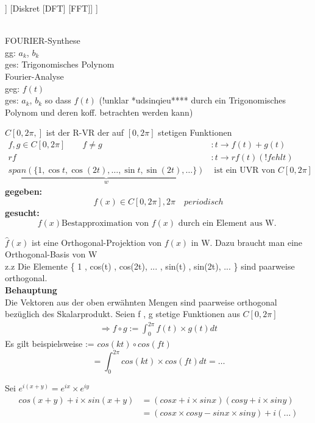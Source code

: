 	\begin{forest}
	[FOURIER-Theorie 
	[	kontinuierlich[Fourier-Reihen]  ]
	[Diskret [DFT] [FFT]]
	]
\end{forest}\\

\newpage
FOURIER-Synthese\\
gg: $a_k$, $b_k$\\
ges: Trigonomisches Polynom\\
Fourier-Analyse\\
geg: $f(t)$\\
ges: $a_k$, $b_k$ so dass $f(t)$ (!unklar *udsinqieu**** durch ein Trigonomisches Polynom und deren koff. betrachten werden kann)\\
\begin{remark}
$	C[0,2\pi,]$ ist der R-VR der auf $[0,2\pi]$ stetigen Funktionen \\

 \begin{align*}
f,g \in C[0,2\pi] \qquad f \neq g &: t \rightarrow f(t) + g(t)\\
r f &:t \rightarrow rf(t)  (!fehlt)\\
\underbrace{span( \{ 1,\cos t , \cos(2t),\dots,\sin t,\sin (2t),\dots   \}) }_{w}&\text{ ist ein UVR von }  C[0,2\pi]
\end{align*}
\textbf{gegeben:} 
\[ f(x) \in  C[0,2\pi] , 2\pi \quad periodisch   \]
\textbf{gesucht:} \[ f(x) \text{Bestapproximation von } f(x)  \text{ durch ein Element aus W. } \]  
\end{remark}
$\hat{f}(x)$ ist eine Orthogonal-Projektion von $f(x)$ in W. Dazu braucht man eine Orthogonal-Basis von W \\
z.z Die Elemente \{ 1 , cos(t) , cos(2t), ... , sin(t) , sin(2t), ... \} sind paarweise orthogonal.\\
\textbf{Behauptung}\\
Die Vektoren aus der oben erwähnten Mengen sind paarweise orthogonal bezüglich des Skalarprodukt.
Seien f , g stetige Funktionen aus $C[0,2 \pi]$  
\begin{align*}
\Rightarrow f \circ  g := \int_{0}^{2 \pi} {f(t) \times  g(t) dt } 
\end{align*}
Es gilt beispielsweise := $ cos(kt) \circ cos(ft)$
$$ = \int_{0}^{2 \pi} cos (kt) \times cos(ft)dt = \dots  $$
\begin{remark}
Sei $e^{i(x+y)}= e^{ix} \times e^{iy} $
\begin{align*}
cos(x+y) + i \times sin(x+y) &= (cos x + i \times sin x) 
(cos y + i \times sin y)\\
&= (cosx \times cos y - sin x \times sin y ) + i( \dots  )
\end{align*}
\end{remark}
